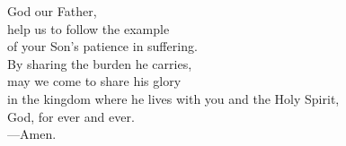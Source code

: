 \prayer


\begin{prayerverse}
God our Father,\\
help us to follow the example\\
of your Son’s patience in suffering.\\
By sharing the burden he carries,\\
may we come to share his glory\\
in the kingdom where he lives with you and the Holy Spirit,\\
God, for ever and ever.\\
{\color{red}---\thinspace}Amen.
\end{prayerverse}

